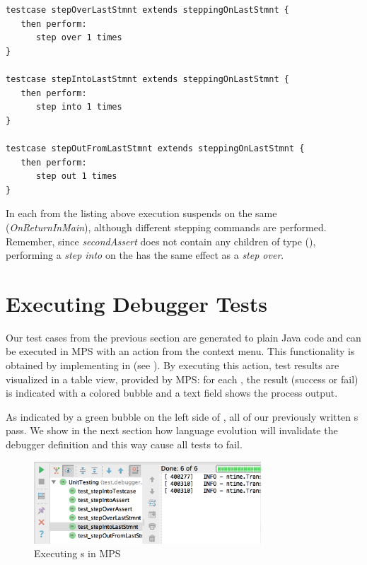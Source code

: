 \begin{lstlisting}[language=testingDSL,
caption=Test stepping commands on last \ic{Statemet} in \ic{Testcase}] 
testcase stepOverLastStmnt extends steppingOnLastStmnt { 
   then perform:                         
      step over 1 times                            
}

testcase stepIntoLastStmnt extends steppingOnLastStmnt {            
   then perform:                         
      step into 1 times                            
}

testcase stepOutFromLastStmnt extends steppingOnLastStmnt {            
   then perform:                         
      step out 1 times                            
}
\end{lstlisting}		

In each  from the listing above execution suspends on the
same  (\emph{OnReturnInMain}), although different stepping
commands are performed. Remember, since \emph{secondAssert} does not contain
any children of type  (\eg {}), performing a
\emph{step into} on the  has the same effect as
a \emph{step over}.

\section{Executing Debugger Tests}

Our test cases from the previous section are generated to plain Java code and
can be executed in \ac{MPS} with an action from the
context menu. This functionality is obtained by implementing  in
 (see ).
By executing this action, test results are visualized in a table view, provided
by \ac{MPS}: for each , the result (success or
fail) is indicated with a colored bubble and a text field shows the
process output.

As indicated by a green bubble on the left side of , all
of our previously written s pass. 
We show in the next section how language evolution will invalidate the debugger
definition and this way cause all tests to fail.

\begin{figure}[h]
	\vspace{-2mm}
	\centering
    \includegraphics[width=8.5cm]{./figures/debuggerTestExec.png} 
    \vspace{-3mm}
	\caption{Executing s in \ac{MPS}}
	\label{fig:TestExecution1}
	\vspace{-3mm}
\end{figure}